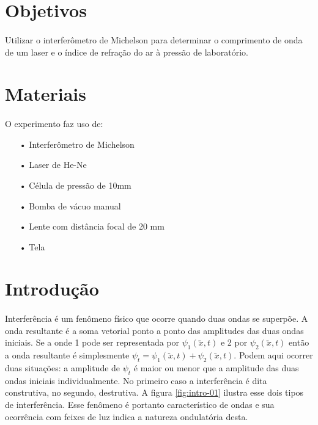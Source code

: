\documentclass[a4paper,11pt]{article}
\begin{document}

\EmptyPage
\tableofcontents
\newpage

\section{Objetivos}
\paragraph{} Utilizar o interferômetro de Michelson para determinar o comprimento de onda de um laser e o índice de refração do ar à pressão de laboratório. 
\section{Materiais}
\paragraph{} O experimento faz uso de:
\begin{itemize}
	\item[•]Interferômetro de Michelson
	\item[•]Laser de He-Ne
	\item[•]Célula de pressão de 10mm
	\item[•]Bomba de vácuo manual
	\item[•]Lente com distância focal de 20 mm
	\item[•]Tela
\end{itemize} 

\newpage
\section{Introdução}
\paragraph{}Interferência é um fenômeno físico que ocorre quando duas ondas se superpõe. A onda resultante é a soma vetorial ponto a ponto das amplitudes das duas ondas iniciais. Se a onde 1 pode ser representada por $\psi_1(\utilde{x}, t)$ e 2 por $\psi_2(\utilde{x}, t)$ então a onda resultante é simplesmente $\psi_t = \psi_1(\utilde{x}, t) + \psi_2(\utilde{x}, t)$. Podem aqui ocorrer duas situações: a amplitude de $\psi_t$ é maior ou menor que a amplitude das duas ondas iniciais individualmente. No primeiro caso a interferência é dita construtiva, no segundo, destrutiva. A figura \ref{fig:intro-01} ilustra esse dois tipos de interferência. Esse fenômeno é portanto característico de ondas e sua ocorrência com feixes de luz indica a natureza ondulatória desta. 
\end{document}
